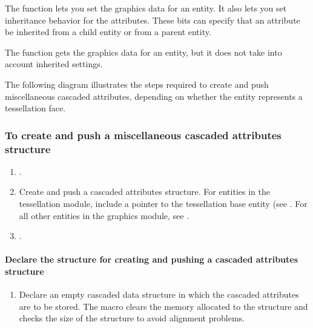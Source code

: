\documentclass[letterpaper,12pt,english,openany,oneside]{sphinxmanual}
\begin{document}
The  function lets you set the graphics data for an entity. It also lets you set inheritance behavior for the attributes. These bits can specify that an attribute be inherited from a child entity or from a parent entity.

The  function gets the graphics data for an entity, but it does not take into account inherited settings.

The following diagram illustrates the steps required to create and push miscellaneous cascaded attributes, depending on whether the entity represents a tessellation face.


\subsubsection{To create and push a miscellaneous cascaded attributes structure}
\label{\detokenize{Plugins_A3D_API:to-create-and-push-a-miscellaneous-cascaded-attributes-structure}}\begin{enumerate}
%
\item {} 
.

\item {} 
Create and push a cascaded attributes structure. For entities in the tessellation module, include a pointer to the tessellation base entity (see . For all other entities in the graphics module, see .

\item {} 
.

\end{enumerate}


\paragraph{Declare the structure for creating and pushing a cascaded attributes structure}
\label{\detokenize{Plugins_A3D_API:declare-the-structure-for-creating-and-pushing-a-cascaded-attributes-structure}}\begin{enumerate}
%
\item {} 
Declare an empty cascaded data structure in which the cascaded attributes are to be stored. The macro  clears the memory allocated to the structure and checks the size of the structure to avoid alignment problems.

\end{enumerate}
\end{document}
